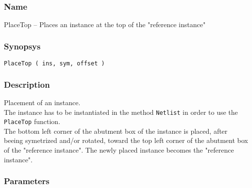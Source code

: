 \subsubsection{Name}

PlaceTop -- Places an instance at the top of the "reference instance"

\subsubsection{Synopsys}

\begin{verbatim}
PlaceTop ( ins, sym, offset )
\end{verbatim}

\subsubsection{Description}

Placement of an instance.\\
\indent The instance has to be instantiated in the method \verb-Netlist- in order to use the \verb-PlaceTop- function.\\
    
\indent The bottom left corner of the abutment box of the instance is placed, after beeing symetrized and/or rotated, toward the top left corner of the abutment box of the "reference instance". The newly placed instance becomes the "reference instance".

\subsubsection{Parameters}

